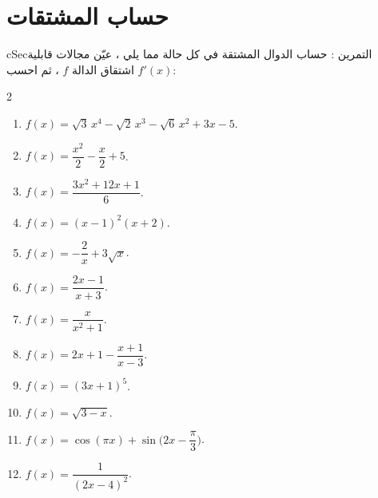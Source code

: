 \documentclass[12pt,a4paper]{article}
\newenvironment{BOX}[2]{\begin{otherlanguage}{english}\begin{arbox}{#1}{#2}}{\end{arbox}\end{otherlanguage}}
\newcounter{exo}
\newenvironment{tamrin}[1]{\stepcounter{exo}\begin{BOX}{cSec}{التمرين \theexo: #1}}{\end{BOX}}
\begin{document}
\section{حساب المشتقات}
\begin{tamrin}{حساب الدوال المشتقة}
في كل حالة مما يلي ، عيّن مجالات قابلية اشتقاق الدالة $f$ ، ثم احسب $f'(x)$:
\begin{multicols}{2}
\begin{enumerate}
\item $f(x)=\sqrt3\,x^4-\sqrt2\,x^3-\sqrt6\,x^2+3x-5$.
\item $f(x)=\dfrac{x^2}{2}-\dfrac x2+5$.
\item $f(x)=\dfrac{3x^2+12x+1}{6}$.
\item $f(x)=(x-1)^2(x+2)$.
\item $f(x)=-\dfrac2x+3\sqrt x$.
\item $f(x)=\dfrac{2x-1}{x+3}$.
\item $f(x)=\dfrac{x}{x^2+1}$.
\item $f(x)=2x+1-\dfrac{x+1}{x-3}$.
\item $f(x)=(3x+1)^5$.
\item $f(x)=\sqrt{3-x}$.
\item $f(x)=\cos(\pi x)+\sin\Big(2x-\dfrac\pi3\Big)$.
\item $f(x)=\dfrac{1}{(2x-4)^2}$.
\end{enumerate}
\end{multicols}
\end{tamrin}

\end{document}
